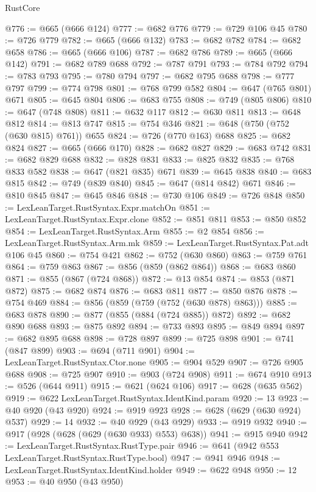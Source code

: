 \begin{lexlean}{RustCore}
\begin{coremodule}
@776 := @665 (@666 @124)
@777 := @682 @776
@779 := @729 @106 @45
@780 := @726 @779
@782 := @665 (@666 @132)
@783 := @682 @782
@784 := @682 @658
@786 := @665 (@666 @106)
@787 := @682 @786
@789 := @665 (@666 @142)
@791 := @682 @789 @688
@792 := @787 @791
@793 := @784 @792
@794 := @783 @793
@795 := @780 @794
@797 := @682 @795 @688
@798 := @777 @797
@799 := @774 @798
@801 := @768 @799 @582
@804 := @647 (@765 @801) @671
@805 := @645 @804
@806 := @683 @755
@808 := @749 (@805 @806)
@810 := @647 (@748 @808)
@811 := @632 @117
@812 := @630 @811
@813 := @648 @812
@814 := @813 @747
@815 := @754 @346
@821 := @648 (@750 (@752 (@630 @815) @761)) @655
@824 := @726 (@770 @163) @688
@825 := @682 @824
@827 := @665 (@666 @170)
@828 := @682 @827
@829 := @683 @742
@831 := @682 @829 @688
@832 := @828 @831
@833 := @825 @832
@835 := @768 @833 @582
@838 := @647 (@821 @835) @671
@839 := @645 @838
@840 := @683 @815
@842 := @749 (@839 @840)
@845 := @647 (@814 @842) @671
@846 := @810 @845
@847 := @645 @846
@848 := @730 @106
@849 := @726 @848
@850 := LexLeanTarget.RustSyntax.Expr.matchOn
@851 := LexLeanTarget.RustSyntax.Expr.clone
@852 := @851 @811
@853 := @850 @852
@854 := LexLeanTarget.RustSyntax.Arm
@855 := @2 @854
@856 := LexLeanTarget.RustSyntax.Arm.mk
@859 := LexLeanTarget.RustSyntax.Pat.adt @106 @45
@860 := @754 @421
@862 := @752 (@630 @860)
@863 := @759 @761
@864 := @759 @863
@867 := @856 (@859 (@862 @864))
@868 := @683 @860
@871 := @855 (@867 (@724 @868))
@872 := @13 @854
@874 := @853 (@871 @872)
@875 := @682 @874
@876 := @683 @811
@877 := @850 @876
@878 := @754 @469
@884 := @856 (@859 (@759 (@752 (@630 @878) @863)))
@885 := @683 @878
@890 := @877 (@855 (@884 (@724 @885)) @872)
@892 := @682 @890 @688
@893 := @875 @892
@894 := @733 @893
@895 := @849 @894
@897 := @682 @895 @688
@898 := @728 @897
@899 := @725 @898
@901 := @741 (@847 @899)
@903 := @694 (@711 @901)
@904 := LexLeanTarget.RustSyntax.Ctor.none
@905 := @904 @529
@907 := @726 @905 @688
@908 := @725 @907
@910 := @903 (@724 @908)
@911 := @674 @910
@913 := @526 (@644 @911)
@915 := @621 (@624 @106)
@917 := @628 (@635 @562)
@919 := @622 LexLeanTarget.RustSyntax.IdentKind.param
@920 := 13
@923 := @40 @920 (@43 @920)
@924 := @919 @923
@928 := @628 (@629 (@630 @924) @537)
@929 := 14
@932 := @40 @929 (@43 @929)
@933 := @919 @932
@940 := @917 (@928 (@628 (@629 (@630 @933) @553) @638))
@941 := @915 @940
@942 := LexLeanTarget.RustSyntax.RustType.pair
@946 := @641 (@942 @553 LexLeanTarget.RustSyntax.RustType.bool)
@947 := @941 @946
@948 := LexLeanTarget.RustSyntax.IdentKind.holder
@949 := @622 @948
@950 := 12
@953 := @40 @950 (@43 @950)

\end{coremodule}
\end{lexlean}
